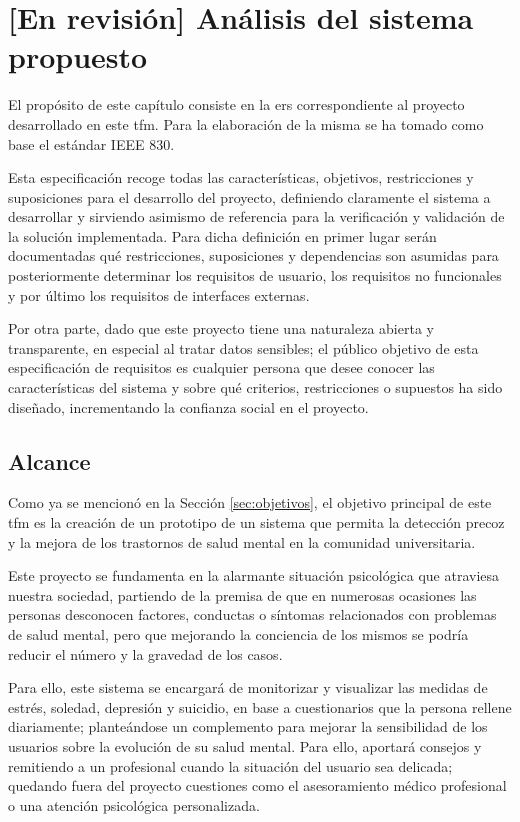 \chapter{[En revisión] Análisis del sistema propuesto}
\label{chapter:analisis}


El propósito de este capítulo consiste en la \gls{ers} correspondiente al proyecto desarrollado en este \gls{tfm}. Para la elaboración de la misma se ha tomado como base el estándar IEEE 830.

Esta especificación recoge todas las características, objetivos, restricciones y suposiciones para el desarrollo del proyecto, definiendo claramente el sistema a desarrollar y sirviendo asimismo de referencia para la verificación y validación de la solución implementada. Para dicha definición en primer lugar serán documentadas qué restricciones, suposiciones y dependencias son asumidas para posteriormente determinar los requisitos de usuario, los requisitos no funcionales y por último los requisitos de interfaces externas.

Por otra parte, dado que este proyecto tiene una naturaleza abierta y transparente, en especial al tratar datos sensibles; el público objetivo de esta especificación de requisitos es cualquier persona que desee conocer las características del sistema y sobre qué criterios, restricciones o supuestos ha sido diseñado, incrementando la confianza social en el proyecto.
        
\section{Alcance}
    \label{req:intro:alcance}
    Como ya se mencionó en la Sección \ref{sec:objetivos}, el objetivo principal de este \gls{tfm} es la creación de un prototipo de un sistema que permita la detección precoz y la mejora de los trastornos de salud mental en la comunidad universitaria. 

    Este proyecto se fundamenta en la alarmante situación psicológica que atraviesa nuestra sociedad, partiendo de la premisa de que en numerosas ocasiones las personas desconocen factores, conductas o síntomas relacionados con problemas de salud mental, pero que mejorando la conciencia de los mismos se podría reducir el número y la gravedad de los casos.

    Para ello, este sistema se encargará de monitorizar y visualizar las medidas de estrés, soledad, depresión y suicidio, en base a cuestionarios que la persona rellene diariamente; planteándose un complemento para mejorar la sensibilidad de los usuarios sobre la evolución de su salud mental. Para ello, aportará consejos y remitiendo a un profesional cuando la situación del usuario sea delicada; quedando fuera del proyecto cuestiones como el asesoramiento médico profesional o una atención psicológica personalizada.

